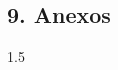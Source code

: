 \begin{spacing}{1.5}
  \begin{tightcenter}
    \section{9. Anexos}
    \mylinespacing
  \end{tightcenter}

  \mylinespacing
  \mylinespacing
  \begin{tightcenter}
  \end{tightcenter}
\end{spacing}{1.5}
